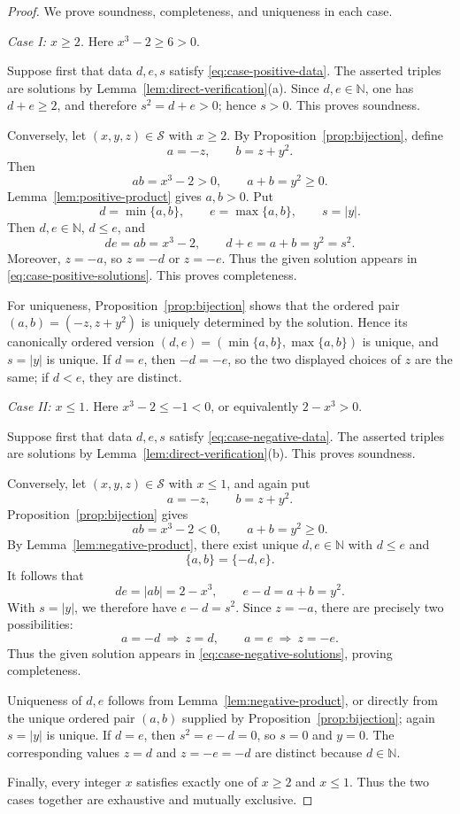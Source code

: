 \documentclass[11pt,a4paper]{article}
\theoremstyle{definition}
\theoremstyle{remark}
\newcommand{\N}{\mathbb N}
\newcommand{\Sols}{\mathscr S}
\begin{document}
\begin{proof}
We prove soundness, completeness, and uniqueness in each case.

\smallskip
\noindent\emph{Case I: $x\geq2$.}
Here $x^3-2\geq6>0$.

Suppose first that data $d,e,s$ satisfy
\eqref{eq:case-positive-data}.  The asserted triples are solutions by
Lemma~\ref{lem:direct-verification}(a).  Since $d,e\in\N$, one has
$d+e\geq2$, and therefore $s^2=d+e>0$; hence $s>0$.
This proves soundness.

Conversely, let $(x,y,z)\in\Sols$ with $x\geq2$.  By
Proposition~\ref{prop:bijection}, define
\[
 a=-z,
 \qquad
 b=z+y^2.
\]
Then
\[
 ab=x^3-2>0,
 \qquad
 a+b=y^2\geq0.
\]
Lemma~\ref{lem:positive-product} gives $a,b>0$.  Put
\[
 d=\min\{a,b\},
 \qquad
 e=\max\{a,b\},
 \qquad
 s=|y|.
\]
Then $d,e\in\N$, $d\leq e$, and
\[
 de=ab=x^3-2,
 \qquad
 d+e=a+b=y^2=s^2.
\]
Moreover, $z=-a$, so $z=-d$ or $z=-e$.  Thus the given solution appears in
\eqref{eq:case-positive-solutions}.  This proves completeness.

For uniqueness, Proposition~\ref{prop:bijection} shows that the ordered pair
$(a,b)=(-z,z+y^2)$ is uniquely determined by the solution.  Hence its
canonically ordered version $(d,e)=(\min\{a,b\},\max\{a,b\})$ is unique, and
$s=|y|$ is unique.  If $d=e$, then $-d=-e$, so the two displayed choices of
$z$ are the same; if $d<e$, they are distinct.

\smallskip
\noindent\emph{Case II: $x\leq1$.}
Here $x^3-2\leq-1<0$, or equivalently $2-x^3>0$.

Suppose first that data $d,e,s$ satisfy
\eqref{eq:case-negative-data}.  The asserted triples are solutions by
Lemma~\ref{lem:direct-verification}(b).  This proves soundness.

Conversely, let $(x,y,z)\in\Sols$ with $x\leq1$, and again put
\[
 a=-z,
 \qquad
 b=z+y^2.
\]
Proposition~\ref{prop:bijection} gives
\[
 ab=x^3-2<0,
 \qquad
 a+b=y^2\geq0.
\]
By Lemma~\ref{lem:negative-product}, there exist unique $d,e\in\N$ with
$d\leq e$ and
\[
 \{a,b\}=\{-d,e\}.
\]
It follows that
\[
 de=|ab|=2-x^3,
 \qquad
 e-d=a+b=y^2.
\]
With $s=|y|$, we therefore have $e-d=s^2$.  Since $z=-a$, there are precisely
two possibilities:
\[
 a=-d\ \Longrightarrow\ z=d,
 \qquad
 a=e\ \Longrightarrow\ z=-e.
\]
Thus the given solution appears in \eqref{eq:case-negative-solutions}, proving
completeness.

Uniqueness of $d,e$ follows from Lemma~\ref{lem:negative-product}, or directly
from the unique ordered pair $(a,b)$ supplied by
Proposition~\ref{prop:bijection}; again $s=|y|$ is unique.  If $d=e$, then
$s^2=e-d=0$, so $s=0$ and $y=0$.  The corresponding values $z=d$ and
$z=-e=-d$ are distinct because $d\in\N$.

Finally, every integer $x$ satisfies exactly one of $x\geq2$ and $x\leq1$.
Thus the two cases together are exhaustive and mutually exclusive.
\end{proof}
\end{document}
